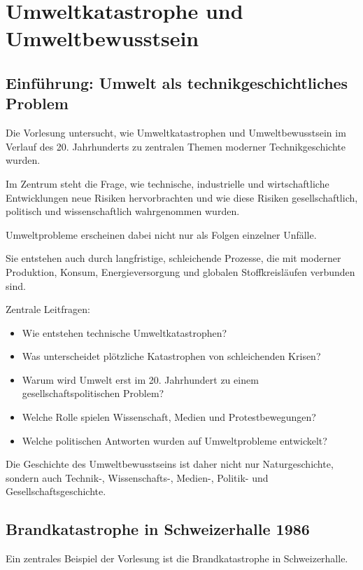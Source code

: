 \section{Umweltkatastrophe und Umweltbewusstsein}

\subsection{Einführung: Umwelt als technikgeschichtliches Problem}

Die Vorlesung untersucht,
wie Umweltkatastrophen und Umweltbewusstsein
im Verlauf des 20. Jahrhunderts
zu zentralen Themen moderner Technikgeschichte wurden.

Im Zentrum steht die Frage,
wie technische,
industrielle und wirtschaftliche Entwicklungen
neue Risiken hervorbrachten
und wie diese Risiken gesellschaftlich,
politisch und wissenschaftlich wahrgenommen wurden.

Umweltprobleme erscheinen dabei nicht nur
als Folgen einzelner Unfälle.

Sie entstehen auch durch langfristige,
schleichende Prozesse,
die mit moderner Produktion,
Konsum,
Energieversorgung
und globalen Stoffkreisläufen verbunden sind.

Zentrale Leitfragen:

\begin{itemize}
\item Wie entstehen technische Umweltkatastrophen?
\item Was unterscheidet plötzliche Katastrophen von schleichenden Krisen?
\item Warum wird Umwelt erst im 20. Jahrhundert zu einem gesellschaftspolitischen Problem?
\item Welche Rolle spielen Wissenschaft, Medien und Protestbewegungen?
\item Welche politischen Antworten wurden auf Umweltprobleme entwickelt?
\end{itemize}

Die Geschichte des Umweltbewusstseins ist daher
nicht nur Naturgeschichte,
sondern auch Technik-,
Wissenschafts-,
Medien-,
Politik-
und Gesellschaftsgeschichte.

\subsection{Brandkatastrophe in Schweizerhalle 1986}

Ein zentrales Beispiel der Vorlesung
ist die Brandkatastrophe in Schweizerhalle.

